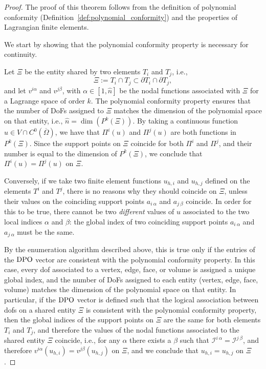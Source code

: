\begin{proof}
  The proof of this theorem follows from the definition of polynomial conformity (Definition~\ref{def:polynomial_conformity}) and the properties of Lagrangian finite elements. 
  
  We start by showing that the polynomial conformity property is necessary for continuity.
  
  Let $\Xi$ be the entity shared by two elements $T_i$ and $T_j$, i.e., 
  \[
  \Xi := T_i \cap T_j \subset \partial T_i \cap \partial T_j,
  \]
  and let $v^{i\alpha}$ and $v^{j\beta}$, with $\alpha \in [1,\hat{n}]$ be the nodal functions associated with  $\Xi$ for a Lagrange space of order $k$. The polynomial conformity property ensures that the number of DoFs assigned to $\Xi$ matches the dimension of the polynomial space on that entity, i.e., $ \hat{n} = \dim(P^k(\Xi))$. By taking a continuous function $u\in V\cap C^0(\overline{\Omega})$, we have that $\Pi^i(u)$ and  $\Pi^j(u)$ are both functions in $P^k(\Xi)$. Since the support points on $\Xi$ coincide for both $\Pi^i$ and $\Pi^j$, and their number is equal to the dimension of $P^k(\Xi)$, we conclude that  $\Pi^i(u) = \Pi^j(u)$ on $\Xi$. 
  
  Conversely, if we take two finite element functions $u_{h,i}$ and $u_{h,j}$ defined on the elements $T^i$ and $T^j$, there is no reasons why they should coincide on $\Xi$, unless their values on the coinciding support points $a_{i~\alpha}$ and $a_{j~\beta}$ coincide. In order for this to be true, there cannot be two \emph{different} values of $u$ associated to the two local indices $\alpha$ and $\beta$: the global index of two coinciding support points $a_{i~\alpha}$ and $a_{j~\alpha}$ must be the same.
  
  By the enumeration algorithm described above, this is true only if the entries of the $\mathrm{DPO}$ vector are consistent with the polynomial conformity property. In this case, every dof associated to a vertex, edge, face, or volume is assigned a unique global index, and the number of DoFs assigned to each entity (vertex, edge, face, volume) matches the dimension of the polynomial space on that entity. In particular, if the $\mathrm{DPO}$ vector is defined such that the logical association between dofs on a shared entity $\Xi$ is consistent with the polynomial conformity property, then the global indices of the support points on $\Xi$ are the same for both elements $T_i$ and $T_j$, and therefore the values of the nodal functions associated to the shared entity $\Xi$ coincide, i.e., for any $\alpha$ there exists a $\beta$ such that $\mathcal{I}^{i~\alpha} = \mathcal{I}^{j~\beta}$, and therefore $v^{i\alpha}(u_{h,i}) = v^{j\beta}(u_{h,j})$ on $\Xi$, and we conclude that $u_{h,i} = u_{h,j}$ on $\Xi$.
\end{proof}

